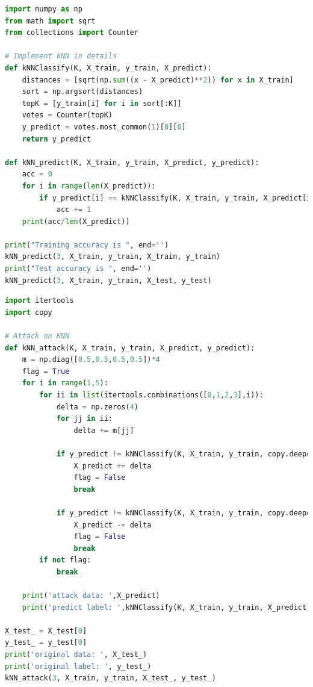 \begin{lstlisting}[language=Python]
import numpy as np
from math import sqrt
from collections import Counter

# Implement kNN in details
def kNNClassify(K, X_train, y_train, X_predict):
    distances = [sqrt(np.sum((x - X_predict)**2)) for x in X_train]
    sort = np.argsort(distances)
    topK = [y_train[i] for i in sort[:K]]
    votes = Counter(topK)
    y_predict = votes.most_common(1)[0][0]
    return y_predict

def kNN_predict(K, X_train, y_train, X_predict, y_predict):
    acc = 0
    for i in range(len(X_predict)):
        if y_predict[i] == kNNClassify(K, X_train, y_train, X_predict[i]):
            acc += 1
    print(acc/len(X_predict))

print("Training accuracy is ", end='')
kNN_predict(3, X_train, y_train, X_train, y_train)
print("Test accuracy is ", end='')
kNN_predict(3, X_train, y_train, X_test, y_test)
\end{lstlisting}

\begin{lstlisting}[language=Python]
import itertools
import copy 

# Attack on KNN
def kNN_attack(K, X_train, y_train, X_predict, y_predict): 
    m = np.diag([0.5,0.5,0.5,0.5])*4
    flag = True
    for i in range(1,5):
        for ii in list(itertools.combinations([0,1,2,3],i)):
            delta = np.zeros(4)
            for jj in ii:
                delta += m[jj]
                
            if y_predict != kNNClassify(K, X_train, y_train, copy.deepcopy(X_predict)+delta):
                X_predict += delta
                flag = False
                break
                
            if y_predict != kNNClassify(K, X_train, y_train, copy.deepcopy(X_predict)-delta):
                X_predict -= delta
                flag = False
                break
        if not flag:
            break
            
    print('attack data: ',X_predict)
    print('predict label: ',kNNClassify(K, X_train, y_train, X_predict))

X_test_ = X_test[0]
y_test_ = y_test[0]
print('original data: ', X_test_)
print('original label: ', y_test_)
kNN_attack(3, X_train, y_train, X_test_, y_test_)
\end{lstlisting}